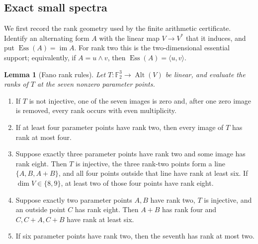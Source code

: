 \documentclass[11pt]{article}
\newtheorem{lemma}[theorem]{Lemma}
\theoremstyle{remark}
\numberwithin{equation}{section}
\begin{document}
\subsection{Exact small spectra}


We first record the rank geometry used by the finite arithmetic certificate.
Identify an alternating form \(A\) with the linear map \(V\to V^*\) that it
induces, and put \(\operatorname{Ess}(A)=\operatorname{im}A\). For rank two this
is the two-dimensional essential support; equivalently, if \(A=u\wedge v\),
then \(\operatorname{Ess}(A)=\langle u,v\rangle\).

\Needspace{0.23\textheight}
\begin{lemma}[Fano rank rules]
Let
\(T:\mathbb F_2^3\to\operatorname{Alt}(V)\) be linear, and evaluate the ranks of
\(T\) at the seven nonzero parameter points.
\end{lemma}


\begin{enumerate}
\item If \(T\) is not injective, one of the seven images is zero and, after one
zero image is removed, every rank occurs with even multiplicity.
\item If at least four parameter points have rank two, then every image of \(T\)
has rank at most four.
\item Suppose exactly three parameter points have rank two and some image has
rank eight. Then \(T\) is injective, the three rank-two points form a line
\(\{A,B,A+B\}\), and all four points outside that line have rank at least
six. If \(\dim V\in\{8,9\}\), at least two of those four points have rank
eight.
\item Suppose exactly two parameter points \(A,B\) have rank two, \(T\) is
injective, and an outside point \(C\) has rank eight. Then \(A+B\) has rank
four and \(C,C+A,C+B\) have rank at least six.
\item If six parameter points have rank two, then the seventh has rank at most
two.
\end{enumerate}
\end{document}
